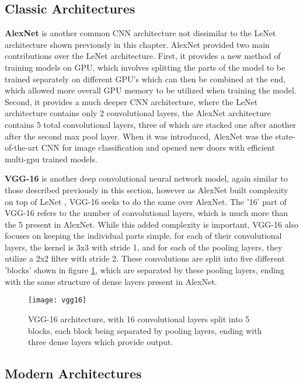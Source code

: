 \subsection{Classic Architectures}
\label{sec:classic-cnn}

\textbf{AlexNet} \cite{alexnet} is another common CNN architecture not dissimilar to the LeNet architecture \cite{lenet5} shown previously in this chapter. AlexNet provided two main contributions over the LeNet architecture. First, it provides a new method of training models on GPU, which involves splitting the parts of the model to be trained separately on different GPU's which can then be combined at the end, which allowed more overall GPU memory to be utilized when training the model. Second, it provides a much deeper CNN architecture, where the LeNet architecture contains only 2 convolutional layers, the AlexNet architecture contains 5 total convolutional layers, three of which are stacked one after another after the second max pool layer. When it was introduced, AlexNet was the state-of-the-art CNN for image classification and opened new doors with efficient multi-gpu trained models.

\textbf{VGG-16} \cite{vgg16} is another deep convolutional neural network model, again similar to those described previously in this section, however as AlexNet \cite{alexnet} built complexity on top of LeNet \cite{lenet5}, VGG-16 seeks to do the same over AlexNet. The '16' part of VGG-16 refers to the number of convolutional layers, which is much more than the 5 present in AlexNet. While this added complexity is important, VGG-16 also focuses on keeping the individual parts simple, for each of their convolutional layers, the kernel is 3x3 with stride 1, and for each of the pooling layers, they utilize a 2x2 filter with stride 2. These convolutions are split into five different 'blocks' shown in figure \ref{fig:vgg16}, which are separated by these pooling layers, ending with the same structure of dense layers present in AlexNet.

\begin{figure}[ht]
	\texttt{[image: vgg16]}
	\centering
	\caption{VGG-16 \cite{vgg16} architecture, with 16 convolutional layers split into 5 blocks, each block being separated by pooling layers, ending with three dense layers which provide output.}
	\label{fig:vgg16}
\end{figure}

\subsection{Modern Architectures}


